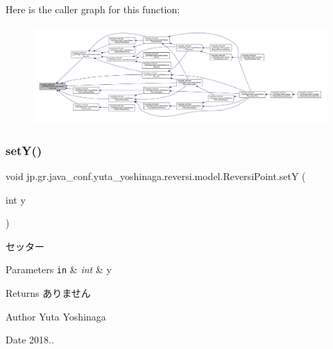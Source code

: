 Here is the caller graph for this function\+:
\nopagebreak
\begin{figure}[H]
\begin{center}
\leavevmode
\includegraphics[width=350pt]{classjp_1_1gr_1_1java__conf_1_1yuta__yoshinaga_1_1reversi_1_1model_1_1_reversi_point_a24da8d887cae320a2ca8b4c80665227c_icgraph}
\end{center}
\end{figure}
\mbox{\label{classjp_1_1gr_1_1java__conf_1_1yuta__yoshinaga_1_1reversi_1_1model_1_1_reversi_point_a7ba3fb3aedb0d02d79ec62f4645bb8cf}} 
\subsubsection{\texorpdfstring{set\+Y()}{setY()}}
{\footnotesize\ttfamily void jp.\+gr.\+java\+\_\+conf.\+yuta\+\_\+yoshinaga.\+reversi.\+model.\+Reversi\+Point.\+setY (\begin{DoxyParamCaption}\item[{int}]{y }\end{DoxyParamCaption})}



セッター 


\begin{DoxyParams}[1]{Parameters}
\mbox{\tt in}  & {\em int} & y \\
\hline
\end{DoxyParams}
\begin{DoxyReturn}{Returns}
ありません 
\end{DoxyReturn}
\begin{DoxyAuthor}{Author}
Yuta Yoshinaga 
\end{DoxyAuthor}
\begin{DoxyDate}{Date}
2018.. 
\end{DoxyDate}


